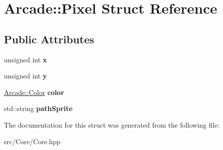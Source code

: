\hypertarget{struct_arcade_1_1_pixel}{}\section{Arcade\+:\+:Pixel Struct Reference}
\label{struct_arcade_1_1_pixel}
\subsection*{Public Attributes}
\begin{DoxyCompactItemize}
\item 
\mbox{\label{struct_arcade_1_1_pixel_a2ed5805b28213cf913de41e0a5c34603}} 
unsigned int {\bfseries x}
\item 
\mbox{\label{struct_arcade_1_1_pixel_a507eb7771cecce88d4d5b3235296835a}} 
unsigned int {\bfseries y}
\item 
\mbox{\label{struct_arcade_1_1_pixel_a20c2e376dff38b4b8331e25b06e4efd9}} 
\mbox{\hyperlink{struct_arcade_1_1_color}{Arcade\+::\+Color}} {\bfseries color}
\item 
\mbox{\label{struct_arcade_1_1_pixel_a44aadf8b3c8573071670e4d85b6ee1d8}} 
std\+::string {\bfseries path\+Sprite}
\end{DoxyCompactItemize}


The documentation for this struct was generated from the following file\+:\begin{DoxyCompactItemize}
\item 
src/\+Core/Core.\+hpp\end{DoxyCompactItemize}
